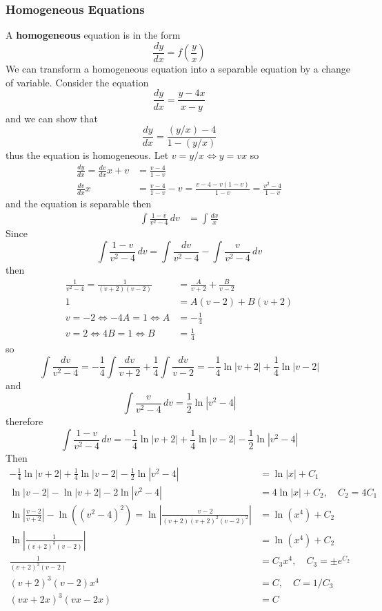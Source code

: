 \subsubsection*{Homogeneous Equations}
A \textbf{homogeneous} equation is in the form
\[\frac{dy}{dx}=f\left(\frac{y}{x}\right)\]
We can transform a homogeneous equation into a separable equation by a change
of variable.
Consider the equation
\[\frac{dy}{dx}=\frac{y-4x}{x-y}\]
and we can show that
\[\frac{dy}{dx}=\frac{(y/x)-4}{1-(y/x)}\]
thus the equation is homogeneous.
Let \(v=y/x\iff y=vx\) so
\begin{align*}
    \frac{dy}{dx}=\frac{dv}{dx}x+v &= \frac{v-4}{1-v} \\
    \frac{dv}{dx}x
    &= \frac{v-4}{1-v}-v=\frac{v-4-v(1-v)}{1-v}=\frac{v^2-4}{1-v}
\end{align*}
and the equation is separable then
\begin{align*}
    \int\frac{1-v}{v^2-4}\,dv &= \int\frac{dx}{x}
\end{align*}
Since
\[\int\frac{1-v}{v^2-4}\,dv=\int\frac{dv}{v^2-4}-\int\frac{v}{v^2-4}\,dv\]
then
\begin{align*}
    \frac{1}{v^2-4}=\frac{1}{(v+2)(v-2)} &= \frac{A}{v+2}+\frac{B}{v-2} \\
    1 &= A(v-2)+B(v+2) \\
    v=-2\iff -4A=1\iff A &= -\frac{1}{4} \\
    v=2\iff 4B=1\iff B &= \frac{1}{4}
\end{align*}
so
\[\int\frac{dv}{v^2-4}
=-\frac{1}{4}\int\frac{dv}{v+2}+\frac{1}{4}\int\frac{dv}{v-2}
=-\frac{1}{4}\ln|v+2|+\frac{1}{4}\ln|v-2|\]
and
\[\int\frac{v}{v^2-4}\,dv=\frac{1}{2}\ln|v^2-4|\]
therefore
\[\int\frac{1-v}{v^2-4}\,dv
=-\frac{1}{4}\ln|v+2|+\frac{1}{4}\ln|v-2|-\frac{1}{2}\ln|v^2-4|\]
Then
\begin{align*}
    -\frac{1}{4}\ln|v+2|+\frac{1}{4}\ln|v-2|-\frac{1}{2}\ln|v^2-4|
    &= \ln|x|+C_1 \\
    \ln|v-2|-\ln|v+2|-2\ln|v^2-4| &= 4\ln|x|+C_2,\quad C_2=4C_1 \\
    \ln\left|\frac{v-2}{v+2}\right|-\ln((v^2-4)^2)
    =\ln\left|\frac{v-2}{(v+2)(v+2)^2(v-2)^2}\right| &= \ln(x^4)+C_2 \\
    \ln\left|\frac{1}{(v+2)^3(v-2)}\right| &= \ln(x^4)+C_2 \\
    \frac{1}{(v+2)^3(v-2)} &= C_3x^4,\quad C_3=\pm e^{C_2} \\
    (v+2)^3(v-2)x^4 &= C,\quad C=1/C_3 \\
    (vx+2x)^3(vx-2x) &= C
\end{align*}
